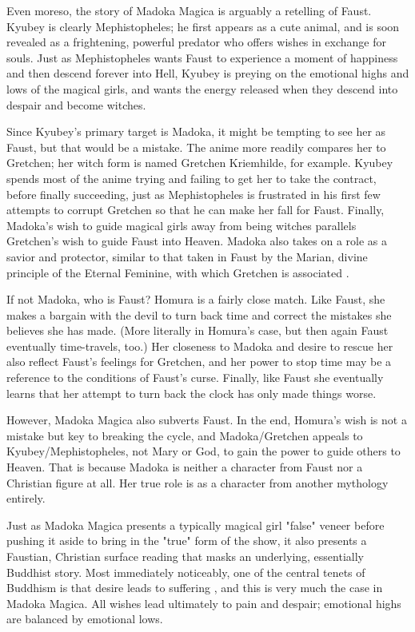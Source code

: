 Even moreso, the story of Madoka Magica is arguably a retelling of Faust. Kyubey is clearly Mephistopheles; he first appears as a cute animal, and is soon revealed as a frightening, powerful predator who offers wishes in exchange for souls. Just as Mephistopheles wants Faust to experience a moment of happiness and then descend forever into Hell, Kyubey is preying on the emotional highs and lows of the magical girls, and wants the energy released when they descend into despair and become witches.

Since Kyubey's primary target is Madoka, it might be tempting to see her as Faust, but that would be a mistake. The anime more readily compares her to Gretchen; her witch form is named Gretchen Kriemhilde, for example. Kyubey spends most of the anime trying and failing to get her to take the contract, before finally succeeding, just as Mephistopheles is frustrated in his first few attempts to corrupt Gretchen so that he can make her fall for Faust. Finally, Madoka's wish to guide magical girls away from being witches parallels Gretchen's wish to guide Faust into Heaven. Madoka also takes on a role as a savior and protector, similar to that taken in Faust by the Marian, divine principle of the Eternal Feminine, with which Gretchen is associated \cite{ref96}. 

If not Madoka, who is Faust? Homura is a fairly close match. Like Faust, she makes a bargain with the devil to turn back time and correct the mistakes she believes she has made. (More literally in Homura's case, but then again Faust eventually time-travels, too.) Her closeness to Madoka and desire to rescue her also reflect Faust's feelings for Gretchen, and her power to stop time may be a reference to the conditions of Faust's curse. Finally, like Faust she eventually learns that her attempt to turn back the clock has only made things worse.

However, Madoka Magica also subverts Faust. In the end, Homura's wish is not a mistake but key to breaking the cycle, and Madoka/Gretchen appeals to Kyubey/Mephistopheles, not Mary or God, to gain the power to guide others to Heaven. That is because Madoka is neither a character from Faust nor a Christian figure at all. Her true role is as a character from another mythology entirely.

Just as Madoka Magica presents a typically magical girl "false" veneer before pushing it aside to bring in the "true" form of the show, it also presents a Faustian, Christian surface reading that masks an underlying, essentially Buddhist story. Most immediately noticeably, one of the central tenets of Buddhism is that desire leads to suffering \cite{ref97}, and this is very much the case in Madoka Magica. All wishes lead ultimately to pain and despair; emotional highs are balanced by emotional lows. 

